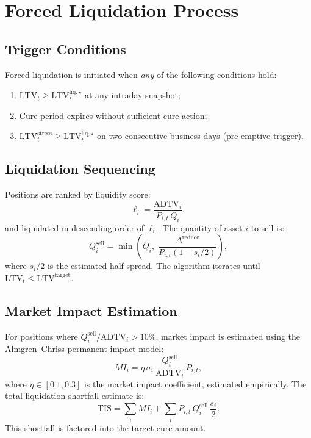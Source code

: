 \documentclass[12pt, a4paper]{article}
\newcommand{\LTV}{\mathrm{LTV}}
\newcommand{\1}{\mathbbm{1}}
\begin{document}
\section{Forced Liquidation Process}
\label{sec:liquidation}

\subsection{Trigger Conditions}
Forced liquidation is initiated when \emph{any} of the following conditions hold:
\begin{enumerate}[leftmargin=1.5em]
    \item $\LTV_t \geq \LTV^{\mathrm{liq},\star}_t$ at any intraday snapshot;
    \item Cure period expires without sufficient cure action;
    \item $\LTV_t^{\mathrm{stress}} \geq \LTV^{\mathrm{liq},\star}_t$ on two
    consecutive business days (pre-emptive trigger).
\end{enumerate}

\subsection{Liquidation Sequencing}

Positions are ranked by liquidity score:
\[
\ell_i = \frac{\mathrm{ADTV}_i}{P_{i,t}\,Q_i},
\]
and liquidated in descending order of $\ell_i$. The quantity of asset $i$ to sell is:
\[
Q_i^{\mathrm{sell}}
= \min\!\left(Q_i,\;
  \frac{\Delta^{\mathrm{reduce}}}{P_{i,t}(1 - s_i/2)}\right),
\]
where $s_i/2$ is the estimated half-spread. The algorithm iterates until
$\LTV_t \leq \LTV^{\mathrm{target}}$.

\subsection{Market Impact Estimation}

For positions where $Q_i^{\mathrm{sell}} / \mathrm{ADTV}_i > 10\%$, market impact
is estimated using the Almgren--Chriss permanent impact model:
\begin{equation}
    MI_i = \eta\,\sigma_i\,\frac{Q_i^{\mathrm{sell}}}{\mathrm{ADTV}_i}\,P_{i,t},
    \label{eq:market_impact}
\end{equation}
where $\eta \in [0.1, 0.3]$ is the market impact coefficient, estimated empirically.
The total liquidation shortfall estimate is:
\[
\mathrm{TIS} = \sum_{i} MI_i + \sum_{i} P_{i,t}\,Q_i^{\mathrm{sell}}\,\frac{s_i}{2}.
\]
This shortfall is factored into the target cure amount.
\end{document}
